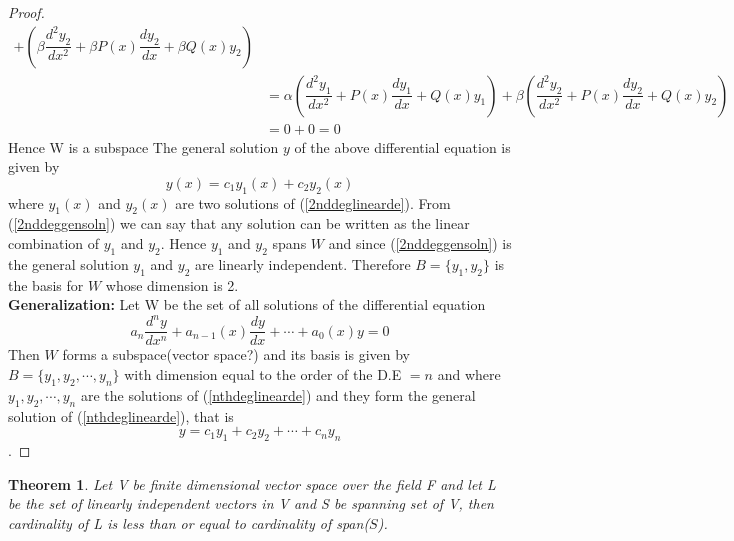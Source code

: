 \documentclass[a4paper, titlepage]{article}
\newtheorem{theorem}{Theorem}[section]
\begin{document}
\begin{enumerate}
\begin{proof}
\begin{align*}
                    +  \left( \beta\dfrac{d^2y_2}{dx^2} + \beta P(x)\dfrac{dy_2}{dx} + \beta Q(x)y_2 \right) \\
                    &= \alpha\left( \dfrac{d^2y_1}{dx^2} + P(x)\dfrac{dy_1}{dx} + Q(x)y_1 \right)
                    +  \beta\left( \dfrac{d^2y_2}{dx^2} + P(x)\dfrac{dy_2}{dx} + Q(x)y_2 \right) \\
                    &= 0 + 0 = 0
                \end{align*}
                Hence W is a subspace
                The general solution $y$ of the above differential equation
                is given by 
                \begin{equation}
                    \label{2nddeggensoln}
                    y(x) = c_1y_1(x) + c_2y_2(x)
                \end{equation} where $y_1(x)$ and
                $y_2(x)$ are two solutions of (\ref{2nddeglinearde}).
                From (\ref{2nddeggensoln}) we can say that any solution
                can be written as the linear combination of $y_1$ and $y_2$.
                Hence $y_1$ and $y_2$ spans $W$ and since (\ref{2nddeggensoln})
                is the general solution $y_1$ and $y_2$ are linearly independent.
                Therefore $B = \{ y_1, y_2 \}$ is the basis for $W$ whose
                dimension is 2. \hfill \\
                \textbf{Generalization: }Let W be the set of all solutions
                of the differential equation
                \begin{equation}
                    \label{nthdeglinearde}
                    a_n\dfrac{d^ny}{dx^n} + a_{n-1}(x)\dfrac{dy}{dx} + \cdots + a_0(x)y = 0
                \end{equation}
                Then $W$ forms a subspace(vector space?) and its basis is
                given by $B = \{ y_1, y_2, \cdots, y_n \}$ with dimension
                equal to the order of the D.E $= n$ and where $y_1, y_2, \cdots, y_n$ 
                are the solutions of (\ref{nthdeglinearde}) and they form the 
                general solution of (\ref{nthdeglinearde}), that
                is \[ y = c_1y_1 + c_2y_2 + \cdots + c_ny_n \].
            \end{proof}
        \end{enumerate}
        \begin{theorem}
            Let V be finite dimensional vector space over the field F
            and let L be the set of linearly independent vectors in
            V and S be spanning set of V, then cardinality of L is 
            less than or equal to cardinality of \textup{span($S$)}.
        \end{theorem}
\end{document}
